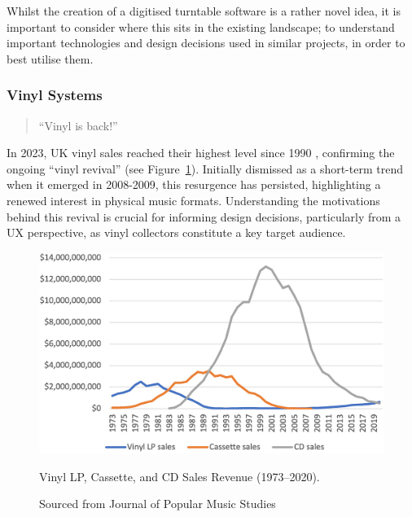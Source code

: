         Whilst the creation of a digitised turntable software is a rather novel idea, it is important to consider where this sits in the existing landscape; to understand important technologies and design decisions used in similar projects, in order to best utilise them.
      
        \subsubsection{Vinyl Systems}
    
            \begin{quote}
                ``Vinyl is back!'' \cite{bechhofervttspec}
            \end{quote}
            
            In 2023, UK vinyl sales reached their highest level since 1990 \cite{geraghty2023uk_vinyl_sales}, confirming the ongoing ``vinyl revival'' \cite{vinylRevival} (see Figure~\ref{fig:vinyl_sales}). Initially dismissed as a short-term trend when it emerged in 2008-2009, this resurgence has persisted, highlighting a renewed interest in physical music formats. Understanding the motivations behind this revival is crucial for informing design decisions, particularly from a UX perspective, as vinyl collectors constitute a key target audience.
            
            \begin{figure}[htbp]
                \centering
                \includegraphics[width=\linewidth]{images/vinyl_sales_2023.png}
                \caption{Vinyl LP, Cassette, and CD Sales Revenue (1973–2020).}
                \caption*{Sourced from Journal of Popular Music Studies \cite{vinylRevival}}
                \label{fig:vinyl_sales}
            \end{figure}
    
